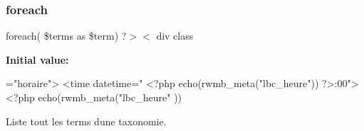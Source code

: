 \subsubsection{\texorpdfstring{foreach}{foreach}}
{\footnotesize\ttfamily foreach( \$terms as \$term) ?$>$$<$ div class}

{\bfseries Initial value\+:}
\begin{DoxyCode}
=\textcolor{stringliteral}{"horaire"}>
                <time datetime=\textcolor{stringliteral}{" <?php echo(rwmb\_meta("}lbc\_heure\textcolor{stringliteral}{")) ?>:00"}><?php echo(rwmb\_meta(\textcolor{stringliteral}{"lbc\_heure"}
      ))
\end{DoxyCode}


Liste tout les terms d\textquotesingle{}une taxonomie. 

